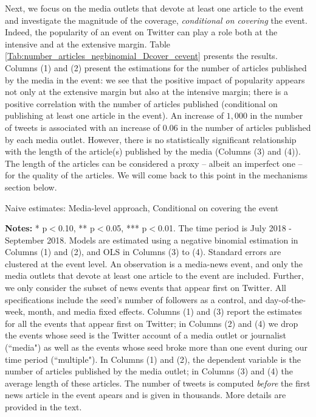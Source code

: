 Next, we focus on the media outlets that devote at least one article to the event and investigate the magnitude of the coverage, \textit{conditional on covering} the event. Indeed, the popularity of an event on Twitter can play a role both at the intensive and at the extensive margin. Table \ref{Tab:number_articles_negbinomial_Dcover_cevent} presents the results. Columns (1) and (2) present the estimations for the number of articles published by the media in the event: we see that the positive impact of popularity appears not only at the extensive margin but also at the intensive margin; there is a positive correlation with the number of articles published (conditional on publishing at least one article in the event). An increase of $1,000$ in the number of tweets is associated with an increase of $0.06$ in the number of articles published by each media outlet. However, there is no statistically significant relationship with the length of the article(s) published by the media (Columns (3) and (4)). The length of the articles can be considered a proxy -- albeit an imperfect one -- for the quality of the articles. We will come back to this point in the mechanisms section below.


\begin{table}
\caption{Naive estimates: Media-level approach, Conditional on covering the event}
\begin{center}
	
\end{center}
\begin{spacing}{0.5}
	{\fns \textbf{Notes:} * p$<$0.10, ** p$<$0.05, *** p$<$0.01. The time period is July 2018 - September 2018.  Models are estimated using a negative binomial estimation in Columns (1) and (2), and OLS in Columns (3) to (4). Standard errors are clustered at the event level. An observation is a media-news event, and only the media outlets that devote at least one article to the event are included. Further, we only consider the subset of news events that appear first on Twitter. All specifications include the seed's number of followers as a control, and day-of-the-week, month, and media fixed effects. Columns (1) and (3) report the estimates for all the events that appear first on Twitter; in Columns (2) and (4) we drop the events whose seed is the Twitter account of a media outlet or journalist (``media") as well as the events whose seed broke more than one event during our time period (``multiple"). In Columns (1) and (2), the dependent variable is the number of articles published by the media outlet; in Columns (3) and (4) the average length of these articles. The number of tweets is computed \textit{before} the first news article in the event apears and is given in thousands. More details are provided in the text.}
\end{spacing}
\label{Tab:number_articles_negbinomial_Dcover_cevent}
\end{table} 



